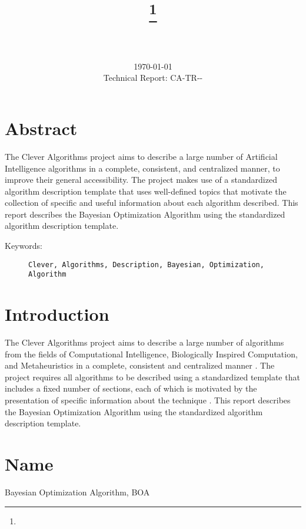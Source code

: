 \documentclass[a4paper, 11pt]{article}
\title{{\myreporttitle}\footnote{\myreportlicense}}
\author{\myreportauthor\\{\myreportemail}\\\small\myreportproject}
\date{\today\\{\small{Technical Report: CA-TR-{\myreportdate}-\myreportversion}}}
\begin{document}
\maketitle

\section*{Abstract} 
The Clever Algorithms project aims to describe a large number of Artificial Intelligence algorithms in a complete, consistent, and centralized manner, to improve their general accessibility. 
The project makes use of a standardized algorithm description template that uses well-defined topics that motivate the collection of specific and useful information about each algorithm described.
This report describes the Bayesian Optimization Algorithm using the standardized algorithm description template.

\begin{description}
	\item[Keywords:] {\small\texttt{Clever, Algorithms, Description, Bayesian, Optimization, Algorithm}}
\end{description} 

\section{Introduction} 
\label{sec:intro}
The Clever Algorithms project aims to describe a large number of algorithms from the fields of Computational Intelligence, Biologically Inspired Computation, and Metaheuristics in a complete, consistent and centralized manner \cite{Brownlee2010}.
The project requires all algorithms to be described using a standardized template that includes a fixed number of sections, each of which is motivated by the presentation of specific information about the technique \cite{Brownlee2010a}.
This report describes the Bayesian Optimization Algorithm using the standardized algorithm description template.

\section{Name} 
\label{sec:name}
Bayesian Optimization Algorithm, BOA
\end{document}
